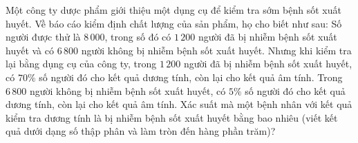 \begin{ex}%
	Một công ty dược phẩm giới thiệu một dụng cụ để kiểm tra sớm bệnh sốt xuất huyết. Về báo cáo kiểm định chất lượng của sản phẩm, họ cho biết như sau: Số người được thử là $8\,000$, trong số đó có $1\,200$ người đã bị nhiễm bệnh sốt xuất huyết và có $6\,800$ người không bị nhiễm bệnh sốt xuất huyết. Nhưng khi kiểm tra lại bằng dụng cụ của công ty, trong $1\,200$ người đã bị nhiễm bệnh sốt xuất huyết, có $70 \%$ số người đó cho kết quả dương tính, còn lại cho kết quả âm tính. Trong $6\,800$ người không bị nhiễm bệnh sốt xuất huyết, có $5 \%$ số người đó cho kết quả dương tính, còn lại cho kết quả âm tính. Xác suất mà một bệnh nhân với kết quả kiểm tra dương tính là bị nhiễm bệnh sốt xuất huyết bằng bao nhiêu (viết kết quả dưới dạng số thập phân và làm tròn đến hàng phần trăm)?\par
\end{ex}
